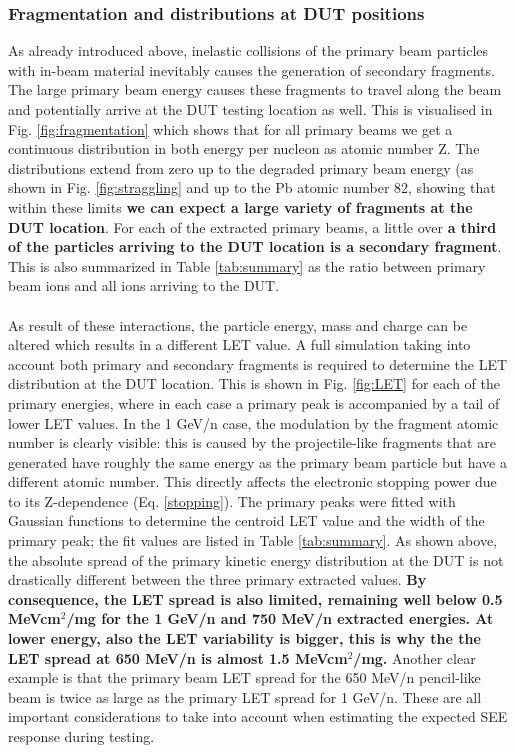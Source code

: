 \subsubsection{Fragmentation and distributions at DUT positions}\label{sec:distribution}

As already introduced above, inelastic collisions of the primary beam particles with in-beam material inevitably causes the generation of secondary fragments. The large primary beam energy causes these fragments to travel along the beam and potentially arrive at the DUT testing location as well. This is visualised in Fig. \ref{fig:fragmentation} which shows that for all primary beams we get a continuous distribution in both energy per nucleon as atomic number Z. The distributions extend from zero up to the degraded primary beam energy (as shown in Fig. \ref{fig:straggling} and up to the Pb atomic number 82, showing that within these limits \textbf{we can expect a large variety of fragments at the DUT location}. For each of the extracted primary beams, a little over \textbf{a third of the particles arriving to the DUT location is a secondary fragment}. This is also summarized in Table \ref{tab:summary} as the ratio between primary beam ions and all ions arriving to the DUT.\\
\\
As result of these interactions, the particle energy, mass and charge can be altered which results in a different LET value. A full simulation taking into account both primary and secondary fragments is required to determine the LET distribution at the DUT location. This is shown in Fig. \ref{fig:LET} for each of the primary energies, where in each case a primary peak is accompanied by a tail of lower LET values. In the 1 GeV/n case, the modulation by the fragment atomic number is clearly visible: this is caused by the projectile-like fragments that are generated have roughly the same energy as the primary beam particle but have a different atomic number. This directly affects the electronic stopping power due to its Z-dependence (Eq. \ref{stopping}). The primary peaks were fitted with Gaussian functions to determine the centroid LET value and the width of the primary peak; the fit values are listed in Table \ref{tab:summary}. As shown above, the absolute spread of the primary kinetic energy distribution at the DUT is not drastically different between the three primary extracted values. \textbf{By consequence,  the LET spread is also limited, remaining well below 0.5 MeVcm$^2$/mg for the 1 GeV/n and 750 MeV/n extracted energies. At lower energy, also the LET variability is bigger, this is why the the LET spread at 650 MeV/n is almost 1.5 MeVcm$^2$/mg.} Another clear example is that the primary beam LET spread for the 650 MeV/n pencil-like beam is twice as large as the primary LET spread for 1 GeV/n. These are all important considerations to take into account when estimating the expected SEE response during testing.

